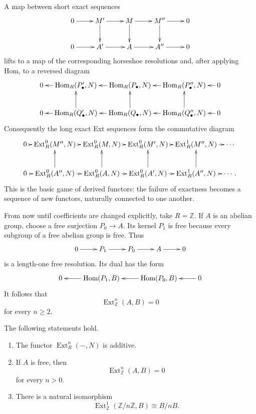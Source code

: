 \noindent
A map between short exact sequences
$$
\xymatrix{
0 \ar[r]
  & M' \ar[r] \ar[d]
  & M \ar[r] \ar[d]
  & M'' \ar[r] \ar[d]
  & 0 \\
0 \ar[r]
  & A' \ar[r]
  & A \ar[r]
  & A'' \ar[r]
  & 0
}
$$
lifts to a map of the corresponding
horseshoe resolutions and, after applying
Hom, to a reversed diagram
$$
\xymatrix@C=1em{
0
  & \operatorname{Hom}_R(P'_\bullet,N)
    \ar[l]
  & \operatorname{Hom}_R(P_\bullet,N)
    \ar[l]
  & \operatorname{Hom}_R(P''_\bullet,N)
    \ar[l]
  & 0 \ar[l] \\
0
  & \operatorname{Hom}_R(Q'_\bullet,N)
    \ar[l] \ar[u]
  & \operatorname{Hom}_R(Q_\bullet,N)
    \ar[l] \ar[u]
  & \operatorname{Hom}_R(Q''_\bullet,N)
    \ar[l] \ar[u]
  & 0 \ar[l].
}
$$
Consequently the long exact Ext sequences
form the commutative diagram
$$
\xymatrix@C=.4em{
0 \ar[r]
  & \operatorname{Ext}^0_R(M'',N)
    \ar[r]
  & \operatorname{Ext}^0_R(M,N)
    \ar[r]
  & \operatorname{Ext}^0_R(M',N)
    \ar[r]
  & \operatorname{Ext}^1_R(M'',N)
    \ar[r]
  & \cdots \\
0 \ar[r]
  & \operatorname{Ext}^0_R(A'',N)
    \ar[r] \ar[u]
  & \operatorname{Ext}^0_R(A,N)
    \ar[r] \ar[u]
  & \operatorname{Ext}^0_R(A',N)
    \ar[r] \ar[u]
  & \operatorname{Ext}^1_R(A'',N)
    \ar[r] \ar[u]
  & \cdots.
}
$$
This is the basic game of derived functors:
the failure of exactness becomes a sequence
of new functors, naturally connected to one
another.

\noindent
From now until coefficients are changed
explicitly, take $R=\mathbb{Z}$.  If $A$
is an abelian group, choose a free
surjection $P_0\to A$.  Its kernel $P_1$
is free because every subgroup of a free
abelian group is free.  Thus
$$
\xymatrix{
0 \ar[r]
  & P_1 \ar[r]
  & P_0 \ar[r]
  & A \ar[r]
  & 0
}
$$
is a length-one free resolution.  Its dual
has the form
$$
\xymatrix{
0
  & \operatorname{Hom}(P_1,B) \ar[l]
  & \operatorname{Hom}(P_0,B) \ar[l]
  & 0 \ar[l].
}
$$
It follows that
$$
\operatorname{Ext}^n_{\mathbb{Z}}(A,B)=0
$$
for every $n\geq2$.

\begin{proposition}
\label{at-proposition-ext-calculations}
The following statements hold.
\begin{enumerate}
\item The functor
$\operatorname{Ext}^n_R(-,N)$ is additive.
\item If $A$ is free, then
$$
\operatorname{Ext}^n_{\mathbb{Z}}(A,B)=0
$$
for every $n>0$.
\item There is a natural isomorphism
$$
\operatorname{Ext}^1_{\mathbb{Z}}
(\mathbb{Z}/n\mathbb{Z},B)
\cong B/nB.
$$
\end{enumerate}
\end{proposition}

